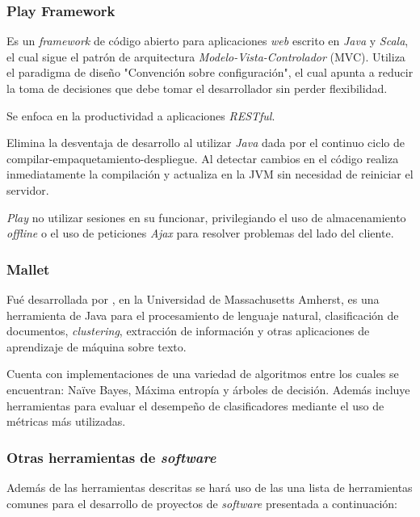 \subsubsection*{Play Framework}
\label{subsubsec:playframework}

Es un \textit{framework} de código abierto para aplicaciones \textit{web} escrito en \textit{Java} y \textit{Scala}, el cual sigue el patrón de arquitectura \textit{Modelo-Vista-Controlador} (MVC). Utiliza el paradigma de diseño "Convención sobre configuración", el cual apunta a reducir la toma de decisiones que debe tomar el desarrollador sin perder flexibilidad. 

Se enfoca en la productividad a aplicaciones \textit{RESTful}.

Elimina la desventaja de desarrollo al utilizar \textit{Java} dada por el continuo ciclo de compilar-empaquetamiento-despliegue. Al detectar cambios en el código realiza inmediatamente la compilación y actualiza en la JVM sin necesidad de reiniciar el servidor.

\textit{Play} no utilizar sesiones en su funcionar, privilegiando el uso de almacenamiento \textit{offline} o el uso de peticiones \textit{Ajax} para resolver problemas del lado del cliente.

\subsubsection*{Mallet}
\label{subsubsec:mallet}

Fué desarrollada por \cite{Mallet}, en la Universidad de Massachusetts Amherst, es una herramienta de Java para el procesamiento de lenguaje natural, clasificación de documentos, \textit{clustering}, extracción de información y otras aplicaciones de aprendizaje de máquina sobre texto.

Cuenta con implementaciones de una variedad de algoritmos entre los cuales se encuentran: Naïve Bayes, Máxima entropía y árboles de decisión. Además incluye herramientas para evaluar el desempeño de clasificadores mediante el uso de métricas más utilizadas.

\subsubsection*{Otras herramientas de \textit{software}}
\label{subsubsec:herrSoft}

Además de las herramientas descritas se hará uso de las una lista de herramientas comunes para el desarrollo de proyectos de \textit{software} presentada a continuación:

